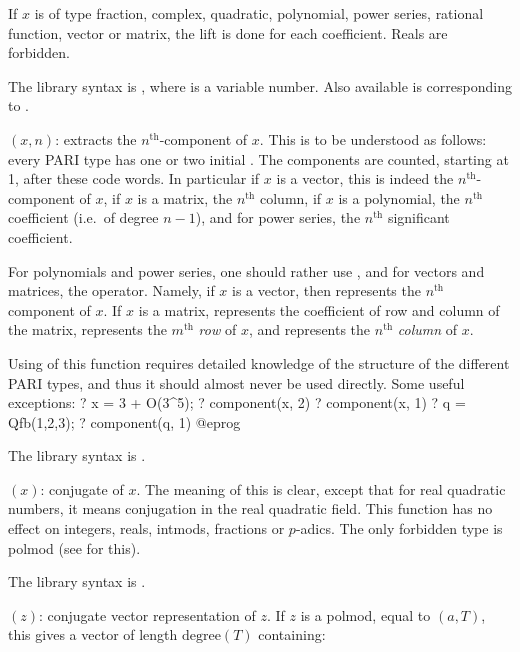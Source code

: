 If $x$ is of type fraction, complex, quadratic, polynomial, power series,
rational function, vector or matrix, the lift is done for each coefficient.
Reals are forbidden.

The library syntax is , where  is a variable number.
Also available is  corresponding to
.

$(x,n)$: \label{se:component}extracts the $n^{\text{th}}$-component of $x$. This is to be understood
as follows: every PARI type has one or two initial . The
components are counted, starting at 1, after these code words. In particular
if $x$ is a vector, this is indeed the $n^{\text{th}}$-component of $x$, if
$x$ is a matrix, the $n^{\text{th}}$ column, if $x$ is a polynomial, the
$n^{\text{th}}$ coefficient (i.e.~of degree $n-1$), and for power series,
the $n^{\text{th}}$ significant coefficient.

For polynomials and power series, one should rather use , and
for vectors and matrices, the \kbd{[$\,$]} operator. Namely, if $x$ is a
vector, then  represents the $n^{\text{th}}$ component of $x$. If
$x$ is a matrix,  represents the coefficient of row  and
column  of the matrix,  represents the $m^{\text{th}}$
\emph{row} of $x$, and  represents the $n^{\text{th}}$
\emph{column} of $x$.

Using of this function requires detailed knowledge of the structure of the
different PARI types, and thus it should almost never be used directly.
Some useful exceptions:
\bprog
    ? x = 3 + O(3^5);
    ? component(x, 2)
    ? component(x, 1)
    ? q = Qfb(1,2,3);
    ? component(q, 1)
@eprog

The library syntax is .

$(x)$: \label{se:conj}
conjugate of $x$. The meaning of this
is clear, except that for real quadratic numbers, it means conjugation in the
real quadratic field. This function has no effect on integers, reals,
intmods, fractions or $p$-adics. The only forbidden type is polmod
(see  for this).

The library syntax is .

$(z)$: \label{se:conjvec}
conjugate vector representation of $z$. If $z$ is a
polmod, equal to $(a,T)$, this gives a vector of length
$\text{degree}(T)$ containing:

